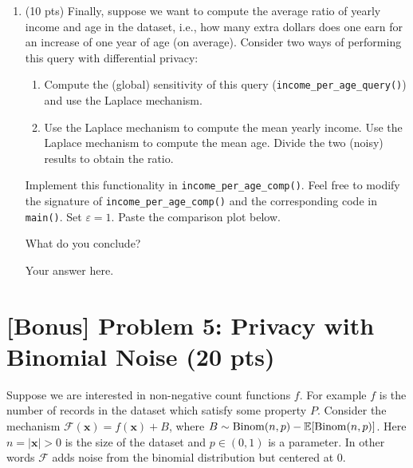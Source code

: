 \documentclass[11pt,letterpaper]{article}
\newenvironment{answer}{\em \color{blue} \begin{adjustwidth}{1cm}{1cm}}{\end{adjustwidth}}
\newcommand{\mc}[1]{\mathcal{#1}}	%
\newcommand{\rv}[1]{\mathbf{#1}}    %
\begin{document}
\begin{enumerate}
	\item (10 pts) Finally, suppose we want to compute the average ratio of yearly income and age in the dataset, i.e., how many extra dollars does one earn for an increase of one year of age (on average). Consider two ways of performing this query with differential privacy:
	\begin{enumerate}[label=(\alph*)]
		\item Compute the (global) sensitivity of this query (\texttt{income\_per\_age\_query()}) and use the Laplace mechanism. 
		\item Use the Laplace mechanism to compute the mean yearly income. Use the Laplace mechanism to compute the mean age. Divide the two (noisy) results to obtain the ratio. 
	\end{enumerate}
	
	Implement this functionality in \texttt{income\_per\_age\_comp()}. Feel free to modify the signature of \texttt{income\_per\_age\_comp()} and the corresponding code in \texttt{main()}. Set $\varepsilon = 1$. Paste the comparison plot below. 
	
	What do you conclude?
	
	\begin{answer}
	
		Your answer here.
		
	\end{answer}
	
%
\end{enumerate}

\newpage
\section*{[Bonus] Problem 5: Privacy with Binomial Noise (20 pts)}
%

Suppose we are interested in non-negative count functions $f$. For example $f$ is the number of records in the dataset which satisfy some property $P$. Consider the mechanism $\mc{F}(\rv{x}) = f(\rv{x}) + B$, where $B \sim {\rm Binom}(n, p) - \mathbb{E}[{\rm Binom}(n, p)]$. Here $n = |\rv{x}| > 0$ is the size of the dataset and $p \in (0,1)$ is a parameter. In other words $\mc{F}$ adds noise from the binomial distribution but centered at 0.
\end{document}
